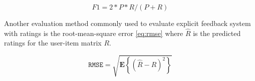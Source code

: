 \begin{equation} \label{eq:f1}
    \mathit{F1} = 2 * P * R / (P + R)
\end{equation}

Another evaluation method commonly used to evaluate explicit feedback system with ratings is the root-mean-square error \rmse \hspace{0.2ex} \eqref{eq:rmse} where $\hat{R}$ is the predicted ratings for the user-item matrix $R$.

\begin{equation} \label{eq:rmse}
    \mathtt{RMSE} = \sqrt{\mathbf{E}\left\{ (\hat{R} - R)^2 \right\}}
\end{equation}

